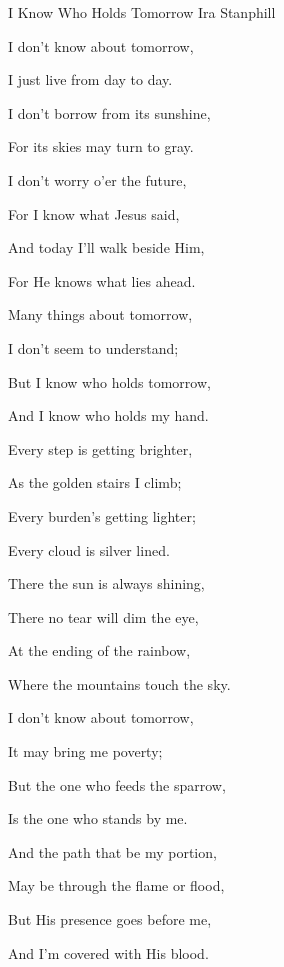 \documentclass[12pt]{book}
\begin{document}
\begin{song}{I Know Who Holds Tomorrow}{}
  {}
  {Ira Stanphill}
  {}
  {}

  \begin{SBVerse}
    I don't know about tomorrow,

    I just live from day to day.

    I don't borrow from its sunshine,

    For its skies may turn to gray.

    I don't worry o'er the future,

    For I know what Jesus said,

    And today I'll walk beside Him,

    For He knows what lies ahead.
  \end{SBVerse}

  \begin{SBOpGroup}
    Many things about tomorrow,

    I don't seem to understand;

    But I know who holds tomorrow,

    And I know who holds my hand.
  \end{SBOpGroup}

  \begin{SBVerse}
    Every step is getting brighter,

    As the golden stairs I climb;

    Every burden's getting lighter;

    Every cloud is silver lined.

    There the sun is always shining,

    There no tear will dim the eye,

    At the ending of the rainbow,

    Where the mountains touch the sky.
  \end{SBVerse}

  \begin{SBVerse}
    I don't know about tomorrow,

    It may bring me poverty;

    But the one who feeds the sparrow,

    Is the one who stands by me.

    And the path that be my portion,

    May be through the flame or flood,

    But His presence goes before me,

    And I'm covered with His blood.
  \end{SBVerse}
\end{song}
\end{document}
